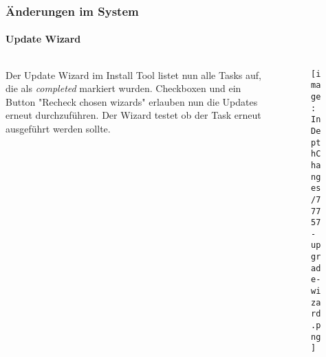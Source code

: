 \begin{frame}[fragile]
	\frametitle{Änderungen im System}
	\framesubtitle{Update Wizard}

	\begin{columns}[T]
		\begin{column}{.5\textwidth}
			Der Update Wizard im Install Tool listet nun alle Tasks auf, die als \textit{completed} markiert wurden.
			\newline\newline
			Checkboxen und ein Button "Recheck chosen wizards" erlauben nun die Updates erneut durchzuführen.
			Der Wizard testet ob der Task erneut ausgeführt werden sollte.
		\end{column}
		\begin{column}{.5\textwidth}
			\begin{figure}\vspace*{-0.5cm}
				\texttt{[image: InDepthChanges/77757-upgrade-wizard.png]}
			\end{figure}
		\end{column}
	\end{columns}

\end{frame}









